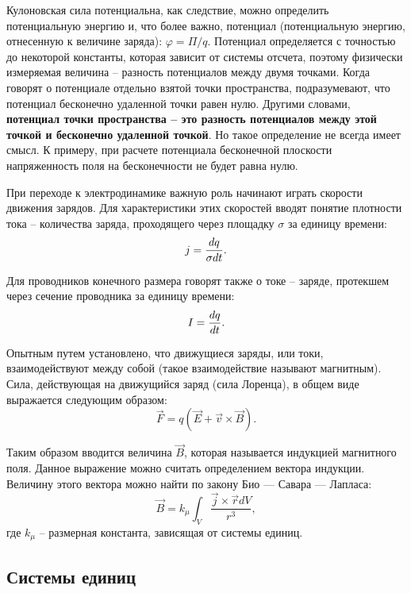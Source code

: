Кулоновская сила потенциальна, как следствие, можно определить потенциальную энергию и, что более важно, потенциал (потенциальную энергию, отнесенную к величине заряда): $\varphi = \Pi/q$. Потенциал определяется с точностью до некоторой константы, которая зависит от системы отсчета, поэтому физически измеряемая величина -- разность потенциалов между двумя точками. Когда говорят о потенциале отдельно взятой точки пространства, подразумевают, что потенциал бесконечно удаленной точки равен нулю. Другими словами, \textbf{потенциал точки пространства -- это разность потенциалов между этой точкой и бесконечно удаленной точкой}. Но такое определение не всегда имеет смысл. К примеру, при расчете потенциала бесконечной плоскости напряженность поля на бесконечности не будет равна нулю.

При переходе к электродинамике важную роль начинают играть скорости движения зарядов. Для характеристики этих скоростей вводят понятие плотности тока -- количества заряда, проходящего через площадку $\sigma$ за единицу времени:
\begin{equation}
	\eqmark
	j = \frac{dq}{\sigma dt}.
\end{equation}

Для проводников конечного размера говорят также о токе -- заряде, протекшем через сечение проводника за единицу времени:
\begin{equation}
	\eqmark[current]
	I = \frac{dq}{dt}.
\end{equation}

Опытным путем установлено, что движущиеся заряды, или токи, взаимодействуют между собой (такое взаимодействие называют магнитным). Сила, действующая на движущийся заряд (сила Лоренца), в общем виде выражается следующим образом:
\begin{equation}
	\vec{F} = q \left( \vec{E} + \vec{v} \times \vec{B} \right).
\end{equation}

Таким образом вводится величина $\vec{B}$, которая называется индукцией магнитного поля. Данное выражение можно считать определением вектора индукции. Величину этого вектора можно найти по закону Био — Савара — Лапласа:
\begin{equation}
	\vec{B} = k_{\mu}\int_{V}{\frac{\vec{j} \times \vec{r} dV}{r^3}},
\end{equation}
где $k_{\mu}$ -- размерная константа, зависящая от системы единиц.

\subsection{Системы единиц}

